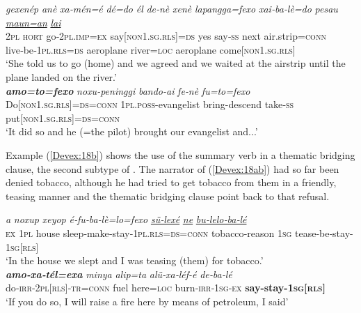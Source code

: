 \documentclass[output=paper]{LSP/langsci}
\begin{document}
	
\begin{exe}
\ex \label{Devex:17ab}
\begin{xlist}
\ex \label{Devex:17a}			     
\gll \textit{gexenép} \textit{anè} \textit{xa‑mén=é} \textit{dé=do} \textit{él} \textit{de‑nè} \textit{xenè} \textit{lapangga=fexo} \textit{xai‑ba‑lè=do} \textit{pesau} 	\underline{\textit{maun=an}}	\underline{\textit{}} \underline{\textit{lai}} \\
\textsc{2pl} \textsc{hort} go‑\textsc{2pl.imp=ex} say[\textsc{non1.sg.rls}]=\textsc{ds} yes say‑\textsc{ss}	next air.strip=\textsc{conn} live‑be‑\textsc{1pl.rls=ds} aeroplane river=\textsc{loc} aeroplane come[\textsc{non1.sg.rls}]\\
\glt `She told us to go (home) and we agreed and we waited at the airstrip until the plane landed on the river.'\\
 
\ex \label{Devex:17b}			     
\gll \textbf{\textit{amo=to=fexo}} \textit{noxu-peninggi} \textit{bando-ai} \textit{fe‑nè} \textit{fu=to=fexo} \\       
Do[\textsc{non1.sg.rls}]=\textsc{ds=conn}	\textsc{1pl.poss}-evangelist bring-descend take‑\textsc{ss} put[\textsc{non1.sg.rls}]=\textsc{ds=conn}\\
\glt `It did so and he (=the pilot) brought our evangelist and...'\\
\end{xlist}
\end{exe}

Example (\ref{Devex:18b}) shows the use of the summary verb in a thematic bridging clause, the second subtype of . The narrator of (\ref{Devex:18ab}) had so far been denied tobacco, although he had tried to get tobacco from them in a friendly, teasing manner and the thematic bridging clause point back to that refusal. 


\begin{exe}
\ex \label{Devex:18ab}
\begin{xlist}
\ex \label{Devex:18a}			     
\gll \textit{a} \textit{noxup} \textit{xeyop} \textit{é‑fu‑ba‑lè=lo=fexo} \underline{\textit{sü‑lexé}} \underline{\textit{ne}} \underline{\textit{bu‑lelo‑ba‑lé}}\\
\textsc{ex} \textsc{1pl} house sleep‑make‑stay‑\textsc{1pl.rls=ds=conn} tobacco‑reason	\textsc{1sg} tease‑be‑stay-\textsc{1sg[rls]} \\ 
\glt `In the house we slept and I was teasing (them) for tobacco.'\\

\ex \label{Devex:18b}			     
\gll \textbf{\textit{amo‑xa‑tél=exa}} \textit{minya} \textit{alip=ta} \textit{alü‑xa‑léf-é} \textit{de‑ba‑lé}	 \\      		
do‑\textsc{irr‑2pl[rls]‑tr=conn}	fuel here=\textsc{loc} burn‑\textsc{irr‑1sg‑ex} \textbf{say-stay-\textsc{1sg[rls]}}  \\
\glt `If you do so, I will raise a fire here by means of petro­leum, I said'\\
\end{xlist}
\end{exe}
\end{document}
